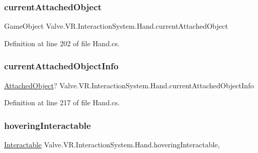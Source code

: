 \subsubsection{\texorpdfstring{currentAttachedObject}{currentAttachedObject}}
{\footnotesize\ttfamily Game\+Object Valve.\+V\+R.\+Interaction\+System.\+Hand.\+current\+Attached\+Object\hspace{0.3cm}{\ttfamily [get]}}



Definition at line 202 of file Hand.\+cs.

\mbox{\label{class_valve_1_1_v_r_1_1_interaction_system_1_1_hand_a2ba850f3dedb0fe8e2e32ac32e45e92d}} 
\subsubsection{\texorpdfstring{currentAttachedObjectInfo}{currentAttachedObjectInfo}}
{\footnotesize\ttfamily \mbox{\hyperlink{struct_valve_1_1_v_r_1_1_interaction_system_1_1_hand_1_1_attached_object}{Attached\+Object}}? Valve.\+V\+R.\+Interaction\+System.\+Hand.\+current\+Attached\+Object\+Info\hspace{0.3cm}{\ttfamily [get]}}



Definition at line 217 of file Hand.\+cs.

\mbox{\label{class_valve_1_1_v_r_1_1_interaction_system_1_1_hand_a0e71fc0b3d20b5faa2b62f6b59f5dfec}} 
\subsubsection{\texorpdfstring{hoveringInteractable}{hoveringInteractable}}
{\footnotesize\ttfamily \mbox{\hyperlink{class_valve_1_1_v_r_1_1_interaction_system_1_1_interactable}{Interactable}} Valve.\+V\+R.\+Interaction\+System.\+Hand.\+hovering\+Interactable\hspace{0.3cm}{\ttfamily [get]}, {\ttfamily [set]}}



